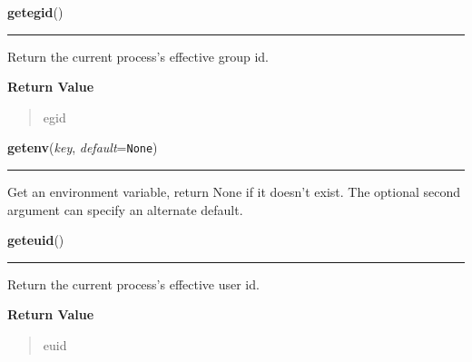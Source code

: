 \hspace{.8\funcindent}\begin{boxedminipage}{\funcwidth}

    \raggedright \textbf{getegid}()

    \vspace{-1.5ex}

    \rule{\textwidth}{0.5\fboxrule}
\setlength{\parskip}{2ex}
    Return the current process's effective group id.

\setlength{\parskip}{1ex}
      \textbf{Return Value}
    \vspace{-1ex}

      \begin{quote}
      egid

      \end{quote}

    \end{boxedminipage}

    \label{os:getenv}

    \vspace{0.5ex}

\hspace{.8\funcindent}\begin{boxedminipage}{\funcwidth}

    \raggedright \textbf{getenv}(\textit{key}, \textit{default}={\tt None})

    \vspace{-1.5ex}

    \rule{\textwidth}{0.5\fboxrule}
\setlength{\parskip}{2ex}
    Get an environment variable, return None if it doesn't exist. The 
    optional second argument can specify an alternate default.

\setlength{\parskip}{1ex}
    \end{boxedminipage}

    \label{os:geteuid}

    \vspace{0.5ex}

\hspace{.8\funcindent}\begin{boxedminipage}{\funcwidth}

    \raggedright \textbf{geteuid}()

    \vspace{-1.5ex}

    \rule{\textwidth}{0.5\fboxrule}
\setlength{\parskip}{2ex}
    Return the current process's effective user id.

\setlength{\parskip}{1ex}
      \textbf{Return Value}
    \vspace{-1ex}

      \begin{quote}
      euid

      \end{quote}

    \end{boxedminipage}


